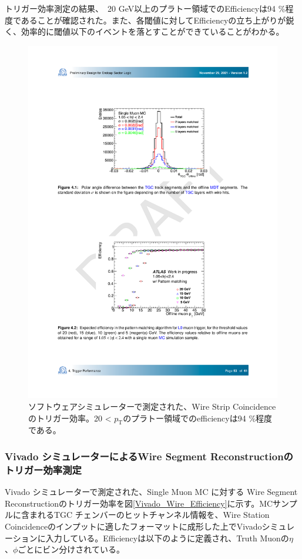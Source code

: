 トリガー効率測定の結果、\pt$\,$ 20 GeV以上のプラトー領域でのEfficiencyは94 \%程度であることが確認された。また、各\pt 閾値に対してEfficiencyの立ち上がりが鋭く、効率的に\pt 閾値以下のイベントを落とすことができていることがわかる。

\begin{figure} 
    \centering
    \includegraphics[width=16cm]{fig/Test/Soft_WS.pdf}
    \caption[ソフトウェアシミュレーターで測定された、Wire Strip Coincidenceのトリガー効率]{ソフトウェアシミュレーターで測定された、Wire Strip Coincidenceのトリガー効率\cite{SLPDR}。20 < $p_\mathrm{T}$のプラトー領域でのefficiencyは94 \%程度である。}
    \label{Soft_WS}
\end{figure}


\subsubsection*{Vivado シミュレーターによるWire Segment Reconstructionのトリガー効率測定}
Vivado シミュレーターで測定された、Single Muon  MC に対する Wire Segment Reconstructionのトリガー効率を図\ref{Vivado_Wire_Efficiency}に示す。MCサンプルに含まれるTGC チェンバーのヒットチャンネル情報を、Wire Station Coincidenceのインプットに適したフォーマットに成形した上でVivadoシミュレーションに入力している。Efficiencyは以下のように定義され、Truth Muonの$\eta$、$\phi$ごとにビン分けされている。

